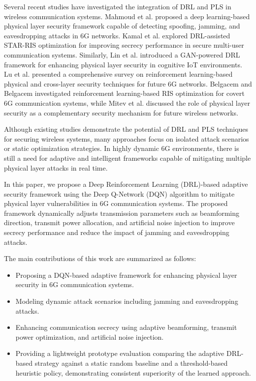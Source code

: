 \documentclass[conference]{IEEEtran}
\begin{document}
Several recent studies have investigated the integration of DRL and PLS in wireless communication systems. Mahmoud et al. \cite{b1} proposed a deep learning-based physical layer security framework capable of detecting spoofing, jamming, and eavesdropping attacks in 6G networks. Kamal et al. \cite{b2} explored DRL-assisted STAR-RIS optimization for improving secrecy performance in secure multi-user communication systems. Similarly, Lin et al. \cite{b3} introduced a GAN-powered DRL framework for enhancing physical layer security in cognitive IoT environments. Lu et al. \cite{b4} presented a comprehensive survey on reinforcement learning-based physical and cross-layer security techniques for future 6G networks. Belgacem and Belgacem \cite{b5} investigated reinforcement learning-based RIS optimization for covert 6G communication systems, while Mitev et al. \cite{b6} discussed the role of physical layer security as a complementary security mechanism for future wireless networks.

Although existing studies demonstrate the potential of DRL and PLS techniques for securing wireless systems, many approaches focus on isolated attack scenarios or static optimization strategies. In highly dynamic 6G environments, there is still a need for adaptive and intelligent frameworks capable of mitigating multiple physical layer attacks in real time.

In this paper, we propose a Deep Reinforcement Learning (DRL)-based adaptive security framework using the Deep Q-Network (DQN) algorithm to mitigate physical layer vulnerabilities in 6G communication systems. The proposed framework dynamically adjusts transmission parameters such as beamforming direction, transmit power allocation, and artificial noise injection to improve secrecy performance and reduce the impact of jamming and eavesdropping attacks.

The main contributions of this work are summarized as follows:

\begin{itemize}

\item Proposing a DQN-based adaptive framework for enhancing physical layer security in 6G communication systems.

\item Modeling dynamic attack scenarios including jamming and eavesdropping attacks.

\item Enhancing communication secrecy using adaptive beamforming, transmit power optimization, and artificial noise injection.

\item Providing a lightweight prototype evaluation comparing the adaptive DRL-based strategy against a static random baseline and a threshold-based heuristic policy, demonstrating consistent superiority of the learned approach.

\end{itemize}
\end{document}
